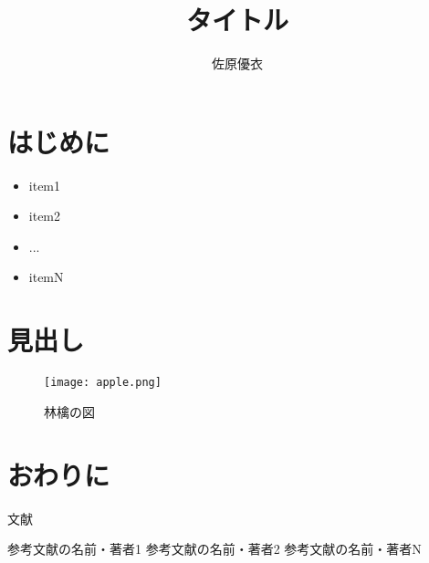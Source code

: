\documentclass[twocolumn]{jsarticle}
\title{タイトル}
\author{佐原優衣}
\date{}
\begin{document}
\maketitle

\section{はじめに}

\begin{itemize}
  \item item1
  \item item2
  \item ...
  \item itemN
\end{itemize}

\section{見出し}

\begin{figure}
  \centering
  \texttt{[image: apple.png]}
  \caption{林檎の図}
  \label{app}
\end{figure}

\section{おわりに}
文献\cite{key1}

\begin{thebibliography}{数字}
   参考文献の名前・著者1
   参考文献の名前・著者2
   参考文献の名前・著者N
\end{thebibliography}
\end{document}
